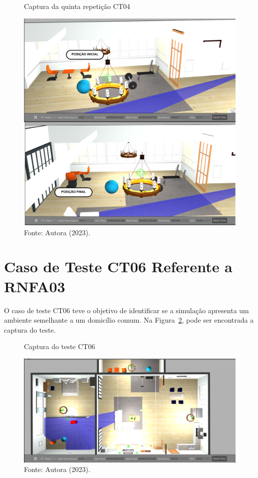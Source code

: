 \begin{figure}[H]
    \centering
    \caption{Captura da quinta repetição CT04}
    \includegraphics[scale=0.5]{ct05_5.png}
    \caption*{Fonte: Autora (2023).}
    \label{fig:ct05_5}
\end{figure}

\section{Caso de Teste CT06 Referente a RNFA03}
O caso de teste CT06 teve o objetivo de identificar se a simulação apresenta um ambiente semelhante a um domicílio comum. Na Figura~\ref{fig:ct06}, pode ser encontrada a captura do teste.

\begin{figure}[H]
    \centering
    \caption{Captura do teste CT06}
    \includegraphics[scale=0.35]{ct06.png}
    \caption*{Fonte: Autora (2023).}
    \label{fig:ct06}
\end{figure}


